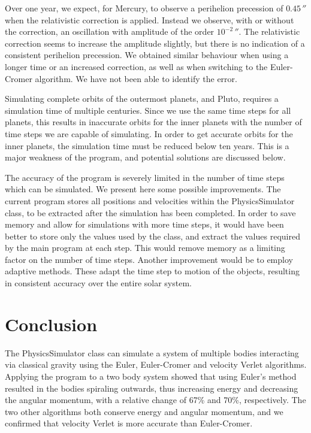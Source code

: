 \documentclass[a4paper,10pt,twocolumn]{article}
\newcommand{\un}[1]{\,\si{#1}}		%
\newcommand{\note}[1]{{\color{red}\quad[$\backslash!/$: #1]}}	%
\begin{document}
Over one year, we expect, for Mercury, to observe a perihelion precession of $0.45\un{\arcsecond}$ when the relativistic correction is applied. Instead we observe, with or without the correction, an oscillation with amplitude of the order $10^{-2}\un\arcsecond$. The relativistic correction seems to increase the amplitude slightly, but there is no indication of a consistent perihelion precession. 
We obtained similar behaviour when using a longer time or an increased correction, as well as when switching to the Euler-Cromer algorithm. 
We have not been able to identify the error. 

Simulating complete orbits of the outermost planets, and Pluto, requires a simulation time of multiple centuries. Since we use the same time steps for all planets, this results in inaccurate orbits for the inner planets with the number of time steps we are capable of simulating. 
In order to get accurate orbits for the inner planets, the simulation time must be reduced below ten years. 
This is a major weakness of the program, and potential solutions are discussed below.      



The accuracy of the  program is severely limited in the number of time steps which can be simulated. We present here some possible improvements.
The current program stores all positions and velocities within the PhysicsSimulator class, to be extracted after the simulation has been completed. In order to save memory and allow for simulations with more time steps, it would have been better to store only the values used by the class, and extract the values required by the main program at each step. This would remove memory as a limiting factor on the number of time steps.
Another improvement would be to employ adaptive methods. These adapt the time step to motion of the objects, resulting in consistent accuracy over the entire solar system.   

%
%
%
\section*{Conclusion}
The PhysicsSimulator class can simulate a system of multiple bodies interacting via classical gravity using the Euler, Euler-Cromer and velocity Verlet algorithms. 
Applying the program to a two body system showed that using Euler's method resulted in the bodies spiraling outwards, thus increasing energy and decreasing the angular momentum, with a relative change of 67\% and 70\%, respectively. 
The two other algorithms both conserve energy and angular momentum, and we confirmed that velocity Verlet is more accurate than Euler-Cromer.
\end{document}
